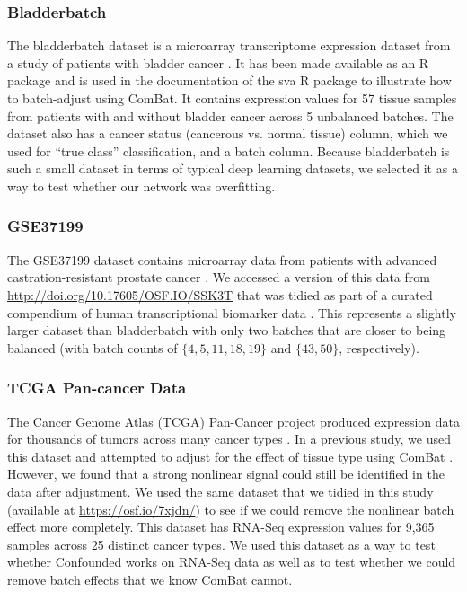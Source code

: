 \documentclass[notitlepage]{article}
\begin{document}
\subsubsection{Bladderbatch}

The bladderbatch dataset is a microarray transcriptome expression dataset from a study of patients with bladder cancer \cite{dyrskjot_gene_2004}.
It has been made available as an R package \cite{leek_bladderbatch_2017} and is used in the documentation of the sva R package \cite{leek_sva_2017} to illustrate how to batch-adjust using ComBat.
It contains expression values for 57 tissue samples from patients with and without bladder cancer across 5 unbalanced batches.
The dataset also has a cancer status (cancerous vs. normal tissue) column, which we used for ``true class'' classification, and a batch column.
Because bladderbatch is such a small dataset in terms of typical deep learning datasets, we selected it as a way to test whether our network was overfitting.

\subsubsection{GSE37199}

The GSE37199 dataset contains microarray data from patients with advanced castration-resistant prostate cancer \cite{olmos_prognostic_2012}.
We accessed a version of this data from \href{http://doi.org/10.17605/OSF.IO/SSK3T}{http://doi.org/10.17605/OSF.IO/SSK3T} that was tidied as part of a curated compendium of human transcriptional biomarker data \cite{golightly_curated_2018}.
This represents a slightly larger dataset than bladderbatch with only two batches that are closer to being balanced (with batch counts of $\{4, 5, 11, 18, 19\}$ and $\{43, 50\}$, respectively).

\subsubsection{TCGA Pan-cancer Data}

The Cancer Genome Atlas (TCGA) Pan-Cancer project produced expression data for thousands of tumors across many cancer types \cite{the_cancer_genome_atlas_research_network_cancer_2013}.
In a previous study, we used this dataset and attempted to adjust for the effect of tissue type using ComBat \cite{dayton_classifying_2017-1}.
However, we found that a strong nonlinear signal could still be identified in the data after adjustment.
We used the same dataset that we tidied in this study (available at \href{https://osf.io/7xjdn/}{https://osf.io/7xjdn/}) to see if we could remove the nonlinear batch effect more completely.
This dataset has RNA-Seq expression values for 9,365 samples across 25 distinct cancer types.
We used this dataset as a way to test whether Confounded works on RNA-Seq data as well as to test whether we could remove batch effects that we know ComBat cannot.
\end{document}
